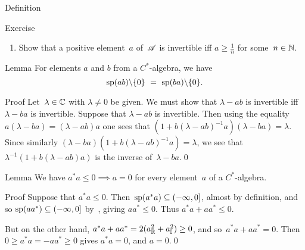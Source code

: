 \documentclass[main]{subfiles}
\begin{document}
\begin{parsec}
\begin{point}{Definition}
\begin{point}{Exercise}
\begin{enumerate}
\item
Show that a positive element~$a$ of~$\mathscr{A}$ is invertible
iff $a\geq \frac{1}{n}$ for some~$n\in \mathbb{N}$.
\end{enumerate}
\end{point}
\end{point}
\begin{point}{Lemma}%
For elements $a$ and $b$ from a $C^*$-algebra,
we have
\begin{equation*}
\spec(ab)\backslash\{0\}\ =\ \spec(ba)\backslash\{0\}.
\end{equation*}
\begin{point}{Proof}%
Let~$\lambda\in \mathbb{C}$ with $\lambda\neq 0$ be given.
We must show that $\lambda - ab$ is invertible
iff $\lambda - ba$ is invertible.
Suppose that $\lambda-ab$ is invertible.
Then using the equality$a(\lambda-ba)=(\lambda-ab)a$
one sees that $(1+b(\lambda-ab)^{-1}a)(\lambda-ba)=\lambda$.
Since similarly $(\lambda-ba)(1+b(\lambda-ab)^{-1}a)=\lambda$,
we see that $\lambda^{-1}(1+b(\lambda-ab)a)$
is the inverse of~$\lambda-ba$.\qed
\end{point}
\end{point}
\begin{point}{Lemma}%
We have $a^*a  \leq 0\implies a=0$
for every element~$a$ of a $C^*$-algebra.
\begin{point}{Proof}%
Suppose that $a^*a\leq 0$.
Then~$\mathrm{sp}(a^*a)\subseteq (-\infty,0]$, almost by definition,
and so $\mathrm{sp}(aa^*)\subseteq (-\infty,0]$ by~,
giving $aa^*\leq 0$.
Thus $a^*a+aa^*\leq 0$.

But on the other hand, 
$a^*a+aa^* = 2(a_{\mathbb{R}}^2 + a_{\mathbb{I}}^2) \geq 0$,
and so~$a^*a+aa^*=0$.
Then $0\geq a^*a=-aa^*\geq 0$ gives $a^*a=0$,
and $a=0$.\qed
\end{point}
\end{point}
\end{parsec}
\end{document}
